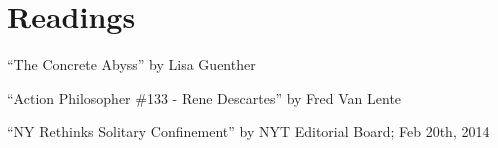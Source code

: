 \documentclass[11 pt, twoside]{article}
\begin{document}
\section{Readings}
\begin{enumerate}
\hypertarget{1}{\item ``The Concrete Abyss'' by Lisa Guenther}
\hypertarget{2}{\item ``Action Philosopher \#133 - Rene Descartes'' by Fred Van Lente}
\hypertarget{3}{\item ``NY Rethinks Solitary Confinement'' by NYT Editorial Board; Feb 20th, 2014}
\end{enumerate}
\end{document}
